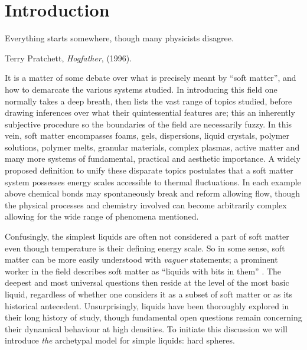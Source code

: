 \documentclass[11pt,twoside]{report}
\begin{document}
\chapter{Introduction}
\epigraph{Everything starts somewhere, though many physicists disagree.}{Terry Pratchett, \emph{Hogfather}, (1996).}

It is a matter of some debate over what is precisely meant by ``soft matter'', and how to demarcate the various systems studied.
In introducing this field one normally takes a deep breath, then lists the vast range of topics studied, before drawing inferences over what their quintessential features are; this an inherently subjective procedure so the boundaries of the field are necessarily fuzzy.
In this vein, soft matter encompasses foams, gels, dispersions, liquid crystals, polymer solutions, polymer melts, granular materials, complex plasmas, active matter and many more systems of fundamental, practical and aesthetic importance.
A widely proposed definition to unify these disparate topics postulates that a soft matter system possesses energy scales accessible to thermal fluctuations.
In each example above chemical bonds may spontaneously break and reform allowing flow, though the physical processes and chemistry involved can become arbitrarily complex allowing for the wide range of phenomena mentioned.

Confusingly, the simplest liquids%
are often not considered a part of soft matter even though temperature is their defining energy scale.
So in some sense, soft matter can be more easily understood with \emph{vaguer} statements; a prominent worker in the field describes soft matter as ``liquids with bits in them'' \cite{Poon2018}.
The deepest and most universal questions then reside at the level of the most basic liquid, regardless of whether one considers it as a subset of soft matter or as its historical antecedent.
Unsurprisingly, liquids have been thoroughly explored in their long history of study, though fundamental open questions remain concerning their dynamical behaviour at high densities.
To initiate this discussion we will introduce \emph{the} archetypal model for simple liquids: hard spheres.
\end{document}
